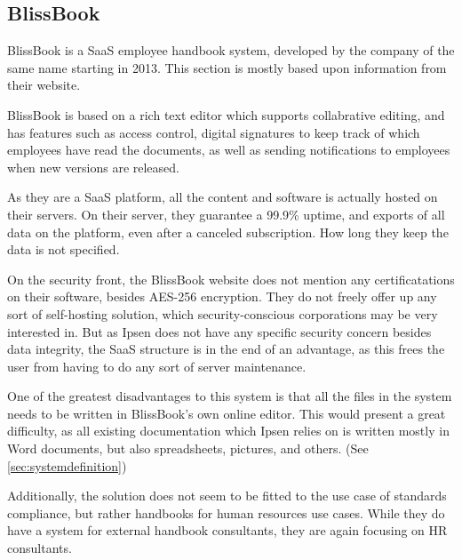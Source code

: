 \subsection{BlissBook}
BlissBook is a SaaS employee handbook system, developed by the company of the same name starting in 2013\cite{BlissbookInfo}.
This section is mostly based upon information from their website\cite{BlissbookContents}.

BlissBook is based on a rich text editor which supports collabrative editing, and has features such as access control, digital signatures to keep track of which employees have read the documents, as well as sending notifications to employees when new versions are released.

As they are a SaaS platform, all the content and software is actually hosted on their servers.
On their server, they guarantee a 99.9\% uptime, and exports of all data on the platform, even after a canceled subscription.
How long they keep the data is not specified.

On the security front, the BlissBook website does not mention any certificatations on their software, besides  AES-256 encryption.\cite{BlissbookSecurity}
They do not freely offer up any sort of self-hosting solution, which security-conscious corporations may be very interested in.
But as Ipsen does not have any specific security concern besides data integrity, the SaaS structure is in the end of an advantage, as this frees the user from having to do any sort of server maintenance.

One of the greatest disadvantages to this system is that all the files in the system needs to be written in BlissBook's own online editor.
This would present a great difficulty, as all existing documentation which Ipsen relies on is written mostly in Word documents, but also spreadsheets, pictures, and others. (See \cref{sec:systemdefinition})

Additionally, the solution does not seem to be fitted to the use case of standards compliance, but rather handbooks for human resources use cases.
While they do have a system for external handbook consultants, they are again focusing on HR consultants.\cite{BlissbookHandbook}

